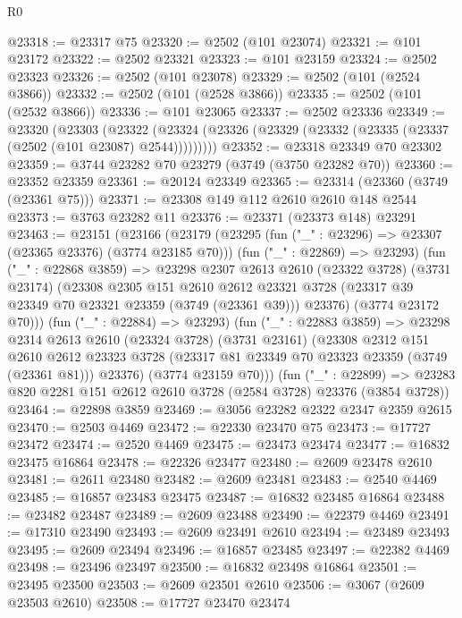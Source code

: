 \begin{lexlean}{R0}
\begin{coremodule}
@23318 := @23317 @75
@23320 := @2502 (@101 @23074)
@23321 := @101 @23172
@23322 := @2502 @23321
@23323 := @101 @23159
@23324 := @2502 @23323
@23326 := @2502 (@101 @23078)
@23329 := @2502 (@101 (@2524 @3866))
@23332 := @2502 (@101 (@2528 @3866))
@23335 := @2502 (@101 (@2532 @3866))
@23336 := @101 @23065
@23337 := @2502 @23336
@23349 := @23320
    (@23303
      (@23322 (@23324 (@23326 (@23329 (@23332 (@23335 (@23337 (@2502 (@101 @23087) @2544)))))))))
@23352 := @23318 @23349 @70 @23302
@23359 := @3744 @23282 @70 @23279 (@3749 (@3750 @23282 @70))
@23360 := @23352 @23359
@23361 := @20124 @23349
@23365 := @23314 (@23360 (@3749 (@23361 @75)))
@23371 := @23308 @149 @112 @2610 @2610 @148 @2544
@23373 := @3763 @23282 @11
@23376 := @23371 (@23373 @148) @23291
@23463 := @23151
    (@23166
      (@23179
        (@23295 (fun ("_" : @23296) => @23307 (@23365 @23376) (@3774 @23185 @70)))
        (fun ("_" : @22869) => @23293)
        (fun ("_" : @22868 @3859) =>
        @23298
          @2307
          @2613
          @2610
          (@23322 @3728)
          (@3731 @23174)
          (@23308
            @2305
            @151
            @2610
            @2612
            @23321
            @3728
            (@23317 @39 @23349 @70 @23321 @23359 (@3749 (@23361 @39)))
            @23376)
          (@3774 @23172 @70)))
      (fun ("_" : @22884) => @23293)
      (fun ("_" : @22883 @3859) =>
      @23298
        @2314
        @2613
        @2610
        (@23324 @3728)
        (@3731 @23161)
        (@23308
          @2312
          @151
          @2610
          @2612
          @23323
          @3728
          (@23317 @81 @23349 @70 @23323 @23359 (@3749 (@23361 @81)))
          @23376)
        (@3774 @23159 @70)))
    (fun ("_" : @22899) =>
    @23283 @820 @2281 @151 @2612 @2610 @3728 (@2584 @3728) @23376 (@3854 @3728))
@23464 := @22898 @3859
@23469 := @3056 @23282 @2322 @2347 @2359 @2615
@23470 := @2503 @4469
@23472 := @22330 @23470 @75
@23473 := @17727 @23472
@23474 := @2520 @4469
@23475 := @23473 @23474
@23477 := @16832 @23475 @16864
@23478 := @22326 @23477
@23480 := @2609 @23478 @2610
@23481 := @2611 @23480
@23482 := @2609 @23481
@23483 := @2540 @4469
@23485 := @16857 @23483 @23475
@23487 := @16832 @23485 @16864
@23488 := @23482 @23487
@23489 := @2609 @23488
@23490 := @22379 @4469
@23491 := @17310 @23490
@23493 := @2609 @23491 @2610
@23494 := @23489 @23493
@23495 := @2609 @23494
@23496 := @16857 @23485
@23497 := @22382 @4469
@23498 := @23496 @23497
@23500 := @16832 @23498 @16864
@23501 := @23495 @23500
@23503 := @2609 @23501 @2610
@23506 := @3067 (@2609 @23503 @2610)
@23508 := @17727 @23470 @23474

\end{coremodule}
\end{lexlean}

